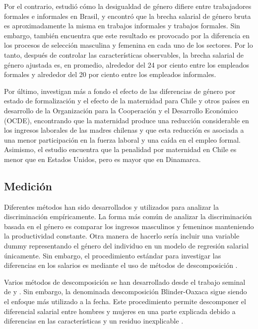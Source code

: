 Por el contrario, \citet{Yahmed2018} estudió cómo la desigualdad de género difiere entre trabajadores formales e informales en Brasil, y encontró que la brecha salarial de género bruta es aproximadamente la misma en trabajos informales y trabajos formales. Sin embargo, también encuentra que este resultado es provocado por la diferencia en los procesos de selección masculina y femenina en cada uno de los sectores. Por lo tanto, después de controlar las características observables, la brecha salarial de género ajustada es, en promedio, alrededor del 24 por ciento entre los empleados formales y alrededor del 20 por ciento entre los empleados informales.

Por último, \citet{Berniell2019} investigan más a fondo el efecto de las diferencias de género por estado de formalización y el efecto de la maternidad para Chile y otros países en desarrollo de la Organización para la Cooperación y el Desarrollo Económico (OCDE), encontrando que la maternidad produce una reducción considerable en los ingresos laborales de las madres chilenas y que esta reducción es asociada a una menor participación en la fuerza laboral y una caída en el empleo formal. Asimismo, el estudio encuentra que la penalidad por maternidad en Chile es menor que en Estados Unidos, pero es mayor que en Dinamarca.
\subsection{Medición}
Diferentes métodos han sido desarrollados y utilizados para analizar la discriminación empíricamente. La forma más común de analizar la discriminación basada en el género es comparar los ingresos masculinos y femeninos manteniendo la productividad constante. Otra manera de hacerlo sería incluir una variable dummy representando el género del individuo en un modelo de regresión salarial únicamente. Sin embargo, el procedimiento estándar para investigar las diferencias en los salarios es mediante el uso de métodos de descomposición \citep{Fortin2011,Weichselbaumer2005}.

Varios métodos de descomposición se han desarrollado desde el trabajo seminal de \citet{Oaxaca1973} y \citet{Blinder1973}. Sin embargo, la denominada descomposición Blinder-Oaxaca sigue siendo el enfoque más utilizado a la fecha. Este procedimiento permite descomponer el diferencial salarial entre hombres y mujeres en una parte explicada debido a diferencias en las características y un residuo inexplicable \citep{Fortin2011,Weichselbaumer2005}.
